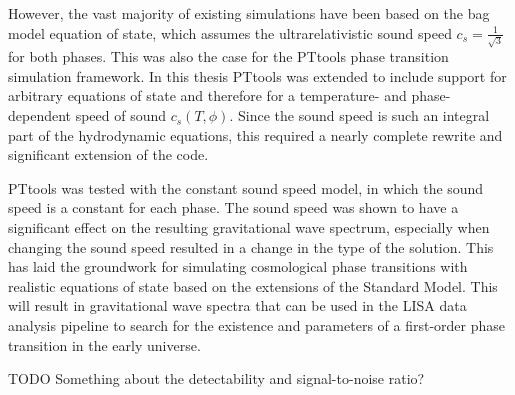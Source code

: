 However, the vast majority of existing simulations have been based on the bag model equation of state, which assumes the ultrarelativistic sound speed $c_s =\frac{1}{\sqrt{3}}$ for both phases.
This was also the case for the PTtools phase transition simulation framework.
In this thesis PTtools was extended  to include support for arbitrary equations of state and therefore for a temperature- and phase-dependent speed of sound $c_s(T,\phi)$.
Since the sound speed is such an integral part of the hydrodynamic equations,
this required a nearly complete rewrite and significant extension of the code.

PTtools was tested with the constant sound speed model, in which the sound speed is a constant for each phase.
The sound speed was shown to have a significant effect on the resulting gravitational wave spectrum,
especially when changing the sound speed resulted in a change in the type of the solution.
This has laid the groundwork for simulating cosmological phase transitions with realistic equations of state based on the extensions of the Standard Model.
This will result in gravitational wave spectra that can be used in the LISA data analysis pipeline to search for the existence and parameters of a first-order phase transition in the early universe.

TODO Something about the detectability and signal-to-noise ratio?
